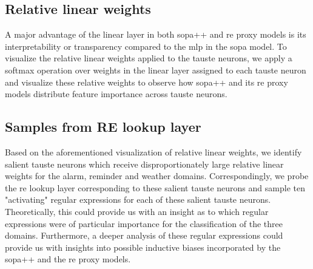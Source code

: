 \subsection{Relative linear weights}

A major advantage of the linear layer in both \ac{sopa}++ and \ac{re} proxy models is its
interpretability or transparency compared to the \ac{mlp} in the \ac{sopa} model. To
visualize the relative linear weights applied to the \ac{tauste} neurons, we apply a
softmax operation over weights in the linear layer assigned to each \ac{tauste}
neuron and visualize these relative weights to observe how \ac{sopa}++ and its \ac{re}
proxy models distribute feature importance across \ac{tauste} neurons.

\subsection{Samples from RE lookup layer}

Based on the aforementioned visualization of relative linear weights, we
identify salient \ac{tauste} neurons which receive disproportionately large relative
linear weights for the alarm, reminder and weather domains. Correspondingly,
we probe the \ac{re} lookup layer corresponding to these salient \ac{tauste} neurons and
sample ten "activating" regular expressions for each of these salient \ac{tauste}
neurons. Theoretically, this could provide us with an insight as to which
regular expressions were of particular importance for the classification of the
three domains. Furthermore, a deeper analysis of these regular expressions
could provide us with insights into possible inductive biases incorporated by the
\ac{sopa}++ and the \ac{re} proxy models.

